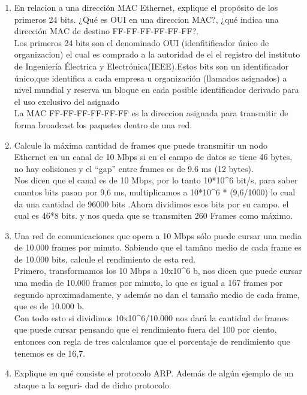 \documentclass{udparticle}
\begin{document}
\begin{enumerate}
    \item En relacion a una dirección MAC Ethernet, explique el propósito de los primeros 24 bits. ¿Qué es OUI en una direccion MAC?,
    ¿qué indica una dirección MAC de destino FF-FF-FF-FF-FF-FF?.\\
    Los primeros 24 bits son el denominado OUI (idenfitificador único de organizacion) el cual es comprado a la autoridad de el 
    el registro del instituto de Ingeniería Électrica y Electrónica(IEEE).Estos bits son un  identificador único,que identifica a 
    cada empresa u organización (llamados asignados) a nivel mundial y reserva un bloque en cada posible identificador derivado para 
    el uso exclusivo del asignado\\
    La  MAC FF-FF-FF-FF-FF-FF es la direccion asignada para transmitir de forma broadcast los paquetes dentro de una red.\\
    \item Calcule la máxima cantidad de frames que puede transmitir un nodo Ethernet en un canal de 10
    Mbps si en el campo de datos se tiene 46 bytes, no hay colisiones y el “gap” entre frames es de
    9.6 ms (12 bytes).\\
    Nos dicen que el canal es de 10 Mbps, por lo tanto 10*10^6 bit/s, para saber cuantos bits pasan por 9,6 ms, multiplicamos a 
    10*10^6 * (9,6/1000) lo cual da una cantidad de 96000 bits .Ahora dividimos esos bits por su campo. el cual es 46*8 bits. y nos 
    queda que se transmiten 260 Frames como máximo.\\
    \item Una red de comunicaciones que opera a 10 Mbps sólo puede cursar una media de 10.000 frames por minuto. Sabiendo que el
    tamãno medio de cada frame es de 10.000 bits, calcule el rendimiento de esta red.\\
    Primero, transformamos los 10 Mbps a 10x10^6 b, nos dicen que puede cursar una media de 10.000 frames por minuto, lo que es igual
    a 167 frames por segundo aproximadamente, y además no dan el tamaño medio de cada frame, que es de 10.000 b.\\
    Con todo esto si dividimos 10x10^6/10.000 nos dará la cantidad de frames que puede cursar pensando que el rendimiento fuera del
    100 por ciento, entonces con regla de tres calculamos que el porcentaje de rendimiento que tenemos es de 16,7.
    \item Explique en qué consiste el protocolo ARP. Además de algún ejemplo de un ataque a la seguri-
    dad de dicho protocolo.\\

\end{enumerate}
\end{document}
